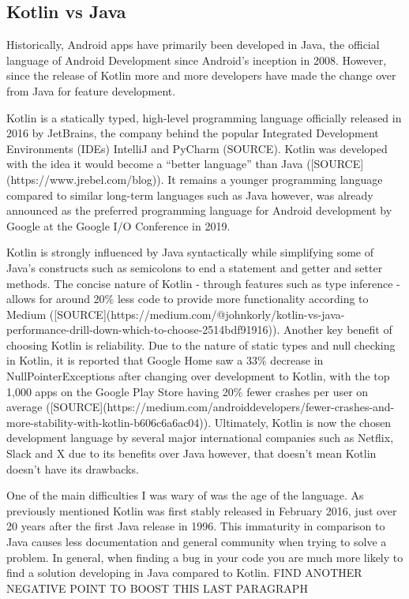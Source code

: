 \documentclass{l4proj}
\begin{document}
\subsection{Kotlin vs Java}

Historically, Android apps have primarily been developed in Java, the official language of Android Development since Android’s inception in 2008. However, since the release of Kotlin more and more developers have made the change over from Java for feature development.

Kotlin is a statically typed, high-level programming language officially released in 2016 by JetBrains, the company behind the popular Integrated Development Environments (IDEs) IntelliJ and PyCharm (SOURCE). Kotlin was developed with the idea it would become a “better language” than Java ([SOURCE](https://www.jrebel.com/blog)). It remains a younger programming language compared to similar long-term languages such as Java however, was already announced as the preferred programming language for Android development by Google at the Google I/O Conference in 2019.

Kotlin is strongly influenced by Java syntactically while simplifying some of Java’s constructs such as semicolons to end a statement and getter and setter methods. The concise nature of Kotlin - through features such as type inference - allows for around 20\% less code to provide more functionality according to Medium ([SOURCE](https://medium.com/@johnkorly/kotlin-vs-java-performance-drill-down-which-to-choose-2514bdf91916)). Another key benefit of choosing Kotlin is reliability. Due to the nature of static types and null checking in Kotlin, it is reported that Google Home saw a 33\% decrease in NullPointerExceptions after changing over development to Kotlin, with the top 1,000 apps on the Google Play Store having 20\% fewer crashes per user on average ([SOURCE](https://medium.com/androiddevelopers/fewer-crashes-and-more-stability-with-kotlin-b606c6a6ac04)). Ultimately, Kotlin is now the chosen development language by several major international companies such as Netflix, Slack and X due to its benefits over Java however, that doesn’t mean Kotlin doesn’t have its drawbacks.

One of the main difficulties I was wary of was the age of the language. As previously mentioned Kotlin was first stably released in February 2016, just over 20 years after the first Java release in 1996. This immaturity in comparison to Java causes less documentation and general community when trying to solve a problem. In general, when finding a bug in your code you are much more likely to find a solution developing in Java compared to Kotlin. FIND ANOTHER NEGATIVE POINT TO BOOST THIS LAST PARAGRAPH
\end{document}
